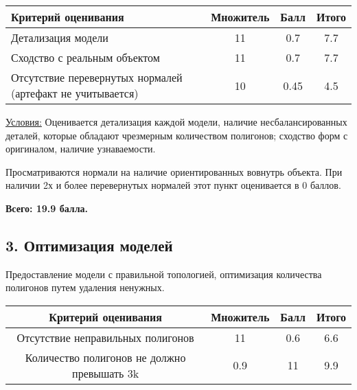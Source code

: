 \begin{table}[H]
    \begin{center}
        \begin{tabular}{|p{8cm}|c|c|c|}
            \hline
            Критерий оценивания	& Множитель	& Балл	& Итого \\
            \hline
            Детализация модели &	11 &	0.7 &	7.7 \\
            \hline
            Сходство с реальным объектом	& 11 &	0.7 &	7.7\\
            \hline 
            Отсутствие перевернутых нормалей (артефакт не учитывается) &	10	& 0.45 &	4.5 \\
            \hline
        \end{tabular} 
    \end {center} 
\end{table}         

\underline{Условия:} Оценивается детализация каждой модели, наличие несбалансированных деталей, которые обладают чрезмерным количеством полигонов; сходство форм с оригиналом, наличие узнаваемости. 

Просматриваются нормали на наличие ориентированных вовнутрь объекта. При наличии 2х и более перевернутых нормалей этот пункт оценивается в 0 баллов.

\textbf{Всего: 19.9 балла.}

\subsection*{3. Оптимизация моделей}

Предоставление модели с правильной топологией, оптимизация количества полигонов путем удаления ненужных.



\begin{table}[H]
    \begin{center}
        \begin{tabular}{|c|c|c|c|}
            \hline
            Критерий оценивания &	Множитель & Балл & Итого \\
            \hline
            Отсутствие неправильных полигонов & 11 & 0.6 & 6.6 \\
            \hline
            Количество полигонов не должно превышать 3k & 0.9 & 11 & 9.9\\
            \hline
        \end{tabular} 
    \end {center} 
\end{table}         
    

